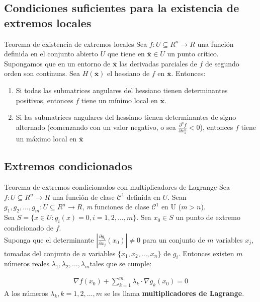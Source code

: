 \documentclass[a4paper, twoside]{article}
\numberwithin{equation}{section}
\numberwithin{figure}{section}
\numberwithin{table}{section}
\newcommand{\vect}[1]{\overline{\textbf{#1}}}
\begin{document}
\subsection{Condiciones suficientes para la existencia de extremos locales}
\begin{teorema*}{Teorema de existencia de extremos locales}
	Sea $f:U\subseteq R^n \to R$ una función definida en el conjunto abierto $U$ que tiene en $\vect{x}\in U$ un punto crítico. Supongamos que en un entorno de $\vect{x}$ las derivadas parciales de $f$ de segundo orden son continuas. Sea $H(\vect{x})$ el hessiano de $f$ en $\vect{x}$. Entonces:
	\begin{enumerate}
		\item Si todas las submatrices angulares del hessiano tienen determinantes positivos, entonces $f$ tiene un mínimo local en $\vect{x}$.
		\item Si las submatrices angulares del hessiano tienen determinantes de signo alternado (comenzando con un valor negativo, o sea $\frac{\partial^n f}{\partial x_1^n}<0$), entonces $f$ tiene un máximo local en $\vect{x}$
	\end{enumerate}
\end{teorema*}

\subsection{Extremos condicionados}
\begin{teorema*}{Teorema de extremos condicionados con multiplicadores de Lagrange}
	Sea $f: U \subseteq R^n \to R$ una función de clase $\mathcal{C}^{1}$ definida en $U$. Sean $g_1,g_2,\ldots,g_m: U \subseteq R^n \to R$,	\textit{m} funciones de clase $\mathcal{C}^{1}$ en U ($m>n$).\\
	
	Sea $S=\{x\in U:g_i (x)=0,i=1,2,\ldots,m\}$. Sea $x_0 \in S$ un punto de extremo condicionado de $f$.\\
	
	Suponga que el determinante $\left|\frac{\partial g_i}{\partial x_j}(x_0)\right|\ne0$ para un conjunto de $m$ variables $x_j$, tomadas del conjunto	de $n$ variables $\{ x_1,x_2,\ldots,x_n\} $ de $g_i$. Entonces existen $m$ números reales $\lambda_1,\lambda_2,\ldots,\lambda_m$tales que se cumple:
	
	\begin{align}
		\nabla f(x_0)+\sum_{k=1}^{m}\lambda_k \cdot \nabla g_k (x_0)=0
	\end{align}
	A los números $\lambda_{k},k=1,2,\ldots,m$ se les llama \textbf{multiplicadores de Lagrange}.
\end{teorema*}
\end{document}

